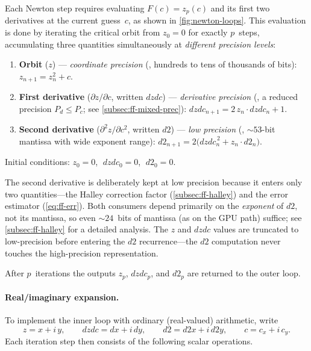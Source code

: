 Each Newton step requires evaluating $F(c) = z_p(c)$ and its first two
derivatives at the current guess~$c$, as shown in \cref{fig:newton-loops}.
This evaluation is done by iterating the
critical orbit from $z_0 = 0$ for exactly $p$~steps, accumulating three
quantities simultaneously at \emph{different precision levels}:

\begin{enumerate}
\item \textbf{Orbit} ($z$) --- \emph{coordinate precision} (,
  hundreds to tens of thousands of bits):
  $z_{n+1} = z_n^2 + c$.
\item \textbf{First derivative} ($\partial z/\partial c$, written
  $\mathit{dzdc}$) --- \emph{derivative precision} (, a
  reduced precision $P_d \le P_c$; see \cref{subsec:ff-mixed-prec}):
  $\mathit{dzdc}_{n+1} = 2\,z_n \cdot \mathit{dzdc}_n + 1$.
\item \textbf{Second derivative} ($\partial^2 z/\partial c^2$, written
  $d2$) --- \emph{low precision} (, ${\sim}53$-bit
  mantissa with wide exponent range):
  $d2_{n+1} = 2\bigl(\mathit{dzdc}_n^{\,2} + z_n \cdot d2_n\bigr)$.
\end{enumerate}

\noindent
Initial conditions: $z_0 = 0$, $\;\mathit{dzdc}_0 = 0$, $\;d2_0 = 0$.

The second derivative is deliberately kept at low precision because it
enters only two quantities---the Halley correction factor
(\cref{subsec:ff-halley}) and the error estimator
(\cref{eq:ff-err}).  Both consumers depend primarily on the
\emph{exponent} of $d2$, not its mantissa, so even ${\sim}24$~bits of
mantissa (as on the GPU path) suffice; see \cref{subsec:ff-halley}
for a detailed analysis.
The $z$ and $\mathit{dzdc}$ values are truncated to low-precision
 before entering the $d2$ recurrence---the $d2$
computation never touches the high-precision 
representation.

After $p$~iterations the outputs $z_p$, $\mathit{dzdc}_p$, and $d2_p$ are
returned to the outer loop.

\paragraph{Real/imaginary expansion.}
To implement the inner loop with ordinary (real-valued) arithmetic, write
\[
z = x + i\,y,\qquad
\mathit{dzdc} = dx + i\,dy,\qquad
d2 = d2x + i\,d2y,\qquad
c = c_x + i\,c_y.
\]
Each iteration step then consists of the following scalar operations.

